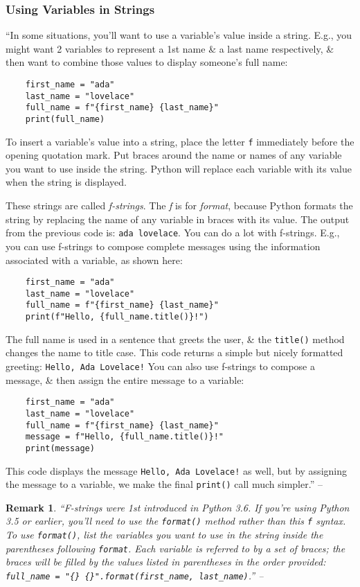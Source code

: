 \documentclass[oneside]{book}
\numberwithin{equation}{section}
\newtheorem{remark}{Remark}[chapter]
\begin{document}
\subsubsection{Using Variables in Strings}
``In some situations, you'll want to use a variable's value inside a string. E.g., you might want 2 variables to represent a 1st name \& a last name respectively, \& then want to combine those values to display someone's full name:
\begin{verbatim}
	first_name = "ada"
	last_name = "lovelace"
	full_name = f"{first_name} {last_name}"
	print(full_name)
\end{verbatim}
To insert a variable's value into a string, place the letter \texttt{f} immediately before the opening quotation mark. Put braces around the name or names of any variable you want to use inside the string. Python will replace each variable with its value when the string is displayed.

These strings are called \textit{f-strings}. The \textit{f} is for \textit{format}, because Python formats the string by replacing the name of any variable in braces with its value. The output from the previous code is: \texttt{ada lovelace}. You can do a lot with f-strings. E.g., you can use f-strings to compose complete messages using the information associated with a variable, as shown here:
\begin{verbatim}
	first_name = "ada"
	last_name = "lovelace"
	full_name = f"{first_name} {last_name}"
	print(f"Hello, {full_name.title()}!")
\end{verbatim}
The full name is used in a sentence that greets the user, \& the \texttt{title()} method changes the name to title case. This code returns a simple but nicely formatted greeting: \texttt{Hello, Ada Lovelace!} You can also use f-strings to compose a message, \& then assign the entire message to a variable:
\begin{verbatim}
	first_name = "ada"
	last_name = "lovelace"
	full_name = f"{first_name} {last_name}"
	message = f"Hello, {full_name.title()}!"
	print(message)
\end{verbatim}
This code displays the message \texttt{Hello, Ada Lovelace!} as well, but by assigning the message to a variable, we make the final \texttt{print()} call much simpler.'' -- \cite[p. 21]{Matthes2019}

\begin{remark}
	``F-strings were 1st introduced in Python 3.6. If you're using Python 3.5 or earlier, you'll need to use the \texttt{format()} method rather than this \texttt{f} syntax. To use \texttt{format()}, list the variables you want to use in the string inside the parentheses following \texttt{format}. Each variable is referred to by a set of braces; the braces will be filled by the values listed in parentheses in the order provided: \verb|full_name = "{} {}".format(first_name, last_name)|.'' -- \cite[p. 22]{Matthes2019}
\end{remark}
\end{document}
